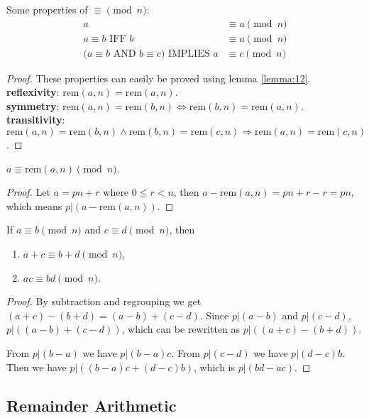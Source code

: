 \documentclass[11pt]{article}
\newcommand{\rem}{\mathrm{rem}}
\begin{document}
\begin{lemma}
Some properties of $\equiv \pmod{n}$:
\begin{align*}
a &\equiv a \pmod{n} \tag{reflexivity} \\
a \equiv b \text{ IFF } b &\equiv a \pmod{n} \tag{symmetry} \\
\text{(}a \equiv b \text{ AND } b \equiv c \text{)} \text{ IMPLIES } a &\equiv c \pmod{n}
\tag{transitivity}
\end{align*}
\end{lemma}

\begin{proof}
These properties can easily be proved using lemma \ref{lemma:12}. \\
\textbf{reflexivity}: $\rem(a,n) = \rem(a,n)$. \\
\textbf{symmetry}: $\rem(a,n)=\rem(b,n) \Leftrightarrow \rem(b,n)=\rem(a,n)$. \\
\textbf{transitivity}: $\rem(a,n)=\rem(b,n) \wedge \rem(b,n)=\rem(c,n) \Rightarrow \rem(a,n)=
\rem(c,n)$.
\end{proof}

\begin{lemma} \label{lemma:14}
$a \equiv \rem(a,n) \pmod{n}$.
\end{lemma}

\begin{proof}
Let $a = pn + r$ where $0 \leq r < n$, then $a-\rem(a,n)=pn+r-r=pn$, which means
$p|(a-\rem(a,n))$.
\end{proof}

\begin{lemma} \label{lemma:15}
If $a \equiv b \pmod{n}$ and $c \equiv d \pmod{n}$, then
\begin{enumerate}
\item $a + c \equiv b + d \pmod{n}$,
\item $ac \equiv bd \pmod{n}$.
\end{enumerate}
\end{lemma}

\begin{proof}
By subtraction and regrouping we get $(a+c)-(b+d)=(a-b)+(c-d)$. Since $p|(a-b)$ and
$p|(c-d)$, $p|((a-b)+(c-d))$, which can be rewritten as $p|((a+c)-(b+d))$.

From $p|(b-a)$ we have $p|(b-a)c$. From $p|(c-d)$ we have $p|(d-c)b$. Then we have
$p|( (b-a)c + (d-c)b )$, which is $p|(bd-ac)$.
\end{proof}

\subsection{Remainder Arithmetic}
\end{document}
